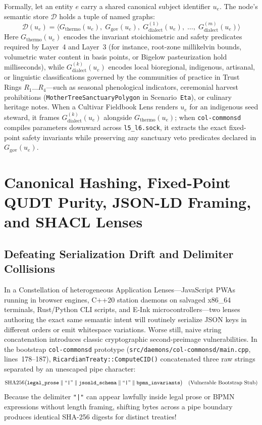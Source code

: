 Formally, let an entity $e$ carry a shared canonical subject identifier $u_e$. The node's semantic store $\mathcal{D}$ holds a tuple of named graphs:
\begin{equation}
    \mathcal{D}(u_e) = \bigl\langle G_{\mathrm{thermo}}(u_e),\; G_{\mathrm{gov}}(u_e),\; G_{\mathrm{dialect}}^{(1)}(u_e),\; \dots,\; G_{\mathrm{dialect}}^{(m)}(u_e) \bigr\rangle
\end{equation}
Here $G_{\mathrm{thermo}}(u_e)$ encodes the invariant stoichiometric and safety predicates required by Layer~4 and Layer~3 (for instance, root-zone millikelvin bounds, volumetric water content in basis points, or Bigelow pasteurization hold milliseconds), while $G_{\mathrm{dialect}}^{(k)}(u_e)$ encodes local bioregional, indigenous, artisanal, or linguistic classifications governed by the communities of practice in Trust Rings $R_1 \dots R_4$---such as seasonal phenological indicators, ceremonial harvest prohibitions (\texttt{MotherTreeSanctuaryPolygon} in Scenario~\texttt{Eta}), or culinary heritage notes. When a Cultivar Fieldbook Lens renders $u_e$ for an indigenous seed steward, it frames $G_{\mathrm{dialect}}^{(k)}(u_e)$ alongside $G_{\mathrm{thermo}}(u_e)$; when \texttt{col-commonsd} compiles parameters downward across \texttt{l5\_l6.sock}, it extracts the exact fixed-point safety invariants while preserving any sanctuary veto predicates declared in $G_{\mathrm{gov}}(u_e)$.

\section{Canonical Hashing, Fixed-Point QUDT Purity, JSON-LD Framing, and SHACL Lenses}
\label{sec:canonicalization-shacl}

\subsection{Defeating Serialization Drift and Delimiter Collisions}

In a Constellation of heterogeneous Application Lenses---JavaScript PWAs running in browser engines, C++20 station daemons on salvaged x86\_64 terminals, Rust/Python CLI scripts, and E-Ink microcontrollers---two lenses authoring the exact same semantic intent will routinely serialize JSON keys in different orders or emit whitespace variations. Worse still, naive string concatenation introduces classic cryptographic second-preimage vulnerabilities. In the bootstrap \texttt{col-commonsd} prototype (\texttt{src/daemons/col-commonsd/main.cpp}, lines~178--187), \texttt{RicardianTreaty::ComputeCID()} concatenated three raw strings separated by an unescaped pipe character:
\begin{equation*}
    \mathrm{SHA256}\bigl(\texttt{legal\_prose} \;\|\; \text{``\texttt{|}''} \;\|\; \texttt{jsonld\_schema} \;\|\; \text{``\texttt{|}''} \;\|\; \texttt{bpmn\_invariants}\bigr) \quad \text{(Vulnerable Bootstrap Stub)}
\end{equation*}
Because the delimiter \texttt{"|"} can appear lawfully inside legal prose or BPMN expressions without length framing, shifting bytes across a pipe boundary produces identical SHA-256 digests for distinct treaties!

